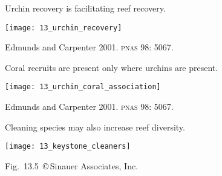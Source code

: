 \documentclass[t]{beamer}
\begin{document}
%
\begin{frame}[t]{Urchin recovery is facilitating reef recovery.}

	\texttt{[image: 13\_urchin\_recovery]}
	
	\vfilll
	
	\hfill \tiny Edmunds and Carpenter 2001. \textsc{pnas} 98: 5067.

\end{frame}
%
\begin{frame}[t]{Coral recruits are present only where urchins are present.}

	{\centering \texttt{[image: 13\_urchin\_coral\_association]}
	
	}
	
	\vfilll
	
	\hfill \tiny Edmunds and Carpenter 2001. \textsc{pnas} 98: 5067.
	

\end{frame}
%
{
\begin{frame}[b]

\hfill \tiny {}
\end{frame}
}
%
\begin{frame}[t]{Cleaning species may also increase reef diversity.}

	\texttt{[image: 13\_keystone\_cleaners]}
	
	\vfilll
	
	\hfill \tiny Fig.~13.5~\copyright\,Sinauer Associates, Inc.
	

\end{frame}
%
\end{document}
